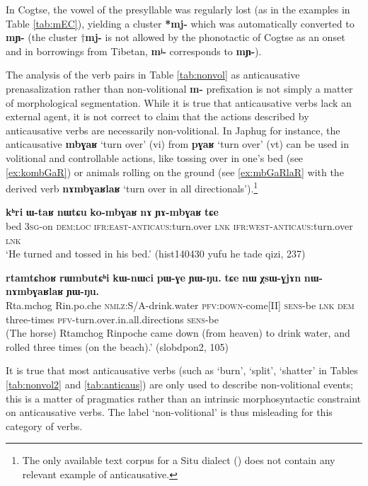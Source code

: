 \documentclass[oneside,a4paper,11pt]{article}
\newcommand{\ipa}[1]{\textbf{{\phon\mbox{#1}}}} %
\begin{document}
In Cogtse, the vowel of the presyllable was regularly lost (as in the examples in Table \ref{tab:mEC}), yielding a cluster \ipa{*mj-} which was automatically converted to \ipa{mɲ-} (the cluster $\dagger$\ipa{mj-} is not allowed by the phonotactic of Cogtse as an onset and in borrowings from Tibetan, \ipa{mʲ-} corresponds to \ipa{mɲ-}).

The analysis of the verb pairs in Table \ref{tab:nonvol} as anticausative prenasalization rather than non-volitional \ipa{m-} prefixation is not simply a matter of morphological segmentation. While it is true that anticausative verbs lack an external agent, it is not correct to claim that the actions described by anticausative verbs are necessarily non-volitional. In Japhug for instance, the anticausative \ipa{mbɣaʁ} `turn over' (vi) from \ipa{pɣaʁ} `turn over' (vt) can be used in volitional and controllable actions, like tossing over in one's bed (see \ref{ex:kombGaR}) or animals rolling on the ground (see \ref{ex:mbGaRlaR} with  the derived verb \ipa{nɤmbɣaʁlaʁ} `turn over in all directionals').\footnote{The only available text corpus for a Situ dialect (\citealt{linyj16cogtse}) does not contain any relevant example of anticausative.}


 \begin{exe}
\ex \label{ex:kombGaR}
\gll \ipa{kʰri} 	\ipa{ɯ-taʁ} 	\ipa{nɯtɕu} 	\ipa{ko-mbɣaʁ} 	\ipa{nɤ} 	\ipa{ɲɤ-mbɣaʁ} 	\ipa{tɕe}  \\
bed \textsc{3sg}-on \textsc{dem:loc} \textsc{ifr:east-anticaus}:turn.over \textsc{lnk} \textsc{ifr:west-anticaus}:turn.over \textsc{lnk} \\
\glt `He turned and tossed in his bed.' (hist140430 yufu he tade qizi, 237)
\end{exe}

 \begin{exe}
\ex \label{ex:mbGaRlaR}
\gll \ipa{rtamtɕhoʁ} 	\ipa{rɯmbutɕʰi} 	\ipa{kɯ-nɯci} 	\ipa{pɯ-ɣe} 	\ipa{ɲɯ-ŋu.} \ipa{tɕe} 	\ipa{nɯ} 	\ipa{χsɯ-ɣjɤn} 	\ipa{nɯ-nɤmbɣaʁlaʁ} 	\ipa{ɲɯ-ŋu.}  \\
 Rta.mchog Rin.po.che \textsc{nmlz}:S/A-drink.water \textsc{pfv:down}-come[II]  \textsc{sens}-be \textsc{lnk} \textsc{dem} three-times \textsc{pfv}-turn.over.in.all.directions  \textsc{sens}-be \\
\glt  (The horse) Rtamchog Rinpoche came down (from heaven) to drink water, and rolled three times (on the beach).' (slobdpon2, 105)
 \end{exe}

It is true that most anticausative verbs (such as `burn', `split', `shatter' in Tables \ref{tab:nonvol2} and \ref{tab:anticaus}) are only used to describe non-volitional events; this is a matter of pragmatics rather than an intrinsic morphosyntactic constraint on anticausative verbs. The label `non-volitional' is thus misleading for this category of verbs.
\end{document}
